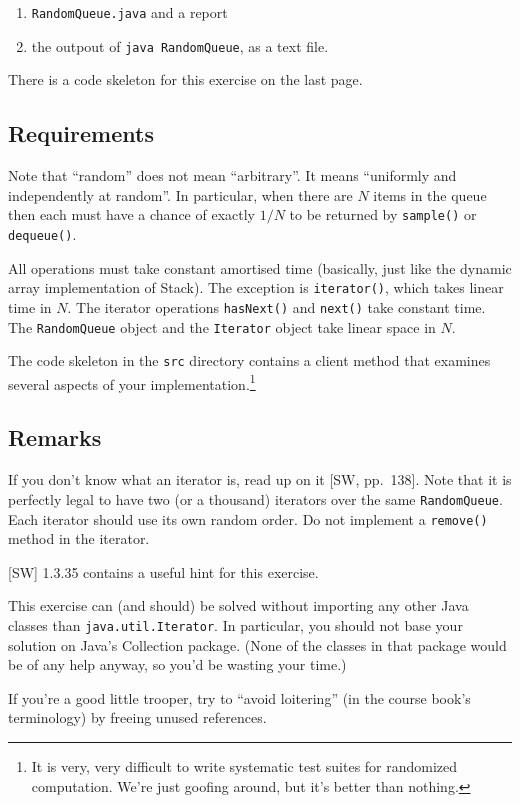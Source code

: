 \documentclass{tufte-handout}
\begin{document}
\begin{enumerate}
\item {\tt RandomQueue.java} and a report
\item the outpout of {\tt java RandomQueue}, as a text file.
\end{enumerate}
There is a code skeleton for this exercise on the last page.

\subsection{Requirements}
Note that ``random'' does not mean ``arbitrary''.
It means ``uniformly and independently at random''.
In particular, when there are $N$ items in the queue then each must
have a chance of exactly $1/N$ to be returned by {\tt sample()} or
{\tt dequeue()}.

All operations must take constant amortised time (basically, just like
the dynamic array implementation of Stack).
The exception is {\tt iterator()}, which takes linear time in $N$.
The iterator operations {\tt hasNext()} and {\tt next()} take constant
time.
The {\tt RandomQueue} object and the {\tt Iterator} object take linear
space in $N$.

The code skeleton in the {\tt src} directory contains a client method
that examines several aspects of your implementation.\footnote{It is very, very difficult to write systematic test suites for
randomized computation. We're just goofing around, but it's better
than nothing.}

\subsection{Remarks}

If you don't know what an iterator is, read up on it [SW, pp.~138].
Note that it is perfectly legal to have two (or a thousand) iterators
over the same {\tt RandomQueue}.
Each iterator should use its own random order.
Do not implement a {\tt remove()} method in the iterator.

[SW] 1.3.35 contains a useful hint for this exercise.

This exercise can (and should) be solved without importing any other
Java classes than {\tt java.util.Iterator}.
In particular, you should not base your solution on Java's Collection
package.
(None of the classes in that package would be of any help anyway, so
you'd be wasting your time.)

If you're a good little trooper, try to ``avoid loitering'' (in the course book's terminology) by freeing
unused references. 
\newpage 
\end{document}
